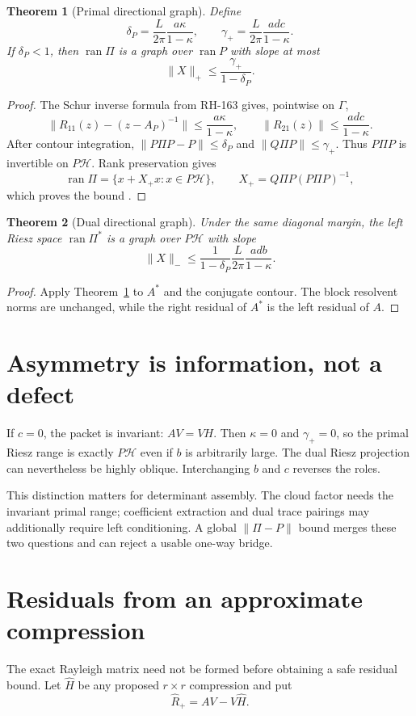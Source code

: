 \documentclass[12pt]{article}
\newtheorem{theorem}{Theorem}
\newcommand{\norm}[1]{\lVert#1\rVert}
\begin{document}
\begin{theorem}[Primal directional graph]\label{thm:primal}
Define
\[
 \delta_P=\frac{L}{2\pi}\frac{a\kappa}{1-\kappa},
 \qquad
 \gamma_+=\frac{L}{2\pi}\frac{adc}{1-\kappa}.
\]
If $\delta_P<1$, then $\operatorname{ran}\Pi$ is a graph over
$\operatorname{ran}P$ with slope at most
\[
 \norm X_+\le\frac{\gamma_+}{1-\delta_P}.
\]
\end{theorem}
\begin{proof}
The Schur inverse formula from RH-163 gives, pointwise on $\Gamma$,
\[
 \norm{R_{11}(z)-(z-A_P)^{-1}}\le\frac{a\kappa}{1-\kappa},
 \qquad
 \norm{R_{21}(z)}\le\frac{adc}{1-\kappa}.
\]
After contour integration,
$\norm{P\Pi P-P}\le\delta_P$ and
$\norm{Q\Pi P}\le\gamma_+$.  Thus $P\Pi P$ is invertible on
$P\mathcal H$.  Rank preservation gives
\[
 \operatorname{ran}\Pi
 =\{x+X_+x:x\in P\mathcal H\},\qquad
 X_+=Q\Pi P(P\Pi P)^{-1},
\]
which proves the bound \citep{Kato1995,WangRH163}.
\end{proof}

\begin{theorem}[Dual directional graph]\label{thm:dual}
Under the same diagonal margin, the left Riesz space
$\operatorname{ran}\Pi^*$ is a graph over $P\mathcal H$ with slope
\[
 \norm X_-\le
 \frac{1}{1-\delta_P}\frac{L}{2\pi}
 \frac{adb}{1-\kappa}.
\]
\end{theorem}
\begin{proof}
Apply Theorem~\ref{thm:primal} to $A^*$ and the conjugate contour.  The block
resolvent norms are unchanged, while the right residual of $A^*$ is the left
residual of $A$.
\end{proof}

\section{Asymmetry is information, not a defect}
If $c=0$, the packet is invariant: $AV=VH$.  Then $\kappa=0$ and
$\gamma_+=0$, so the primal Riesz range is exactly $P\mathcal H$ even if
$b$ is arbitrarily large.  The dual Riesz projection can nevertheless be
highly oblique.  Interchanging $b$ and $c$ reverses the roles.

This distinction matters for determinant assembly.  The cloud factor needs
the invariant primal range; coefficient extraction and dual trace pairings
may additionally require left conditioning.  A global
$\norm{\Pi-P}$ bound merges these two questions and can reject a usable
one-way bridge.

\section{Residuals from an approximate compression}
The exact Rayleigh matrix need not be formed before obtaining a safe residual
bound.  Let $\widehat H$ be any proposed $r\times r$ compression and put
\[
 \widehat R_+=AV-V\widehat H.
\]
\end{document}
